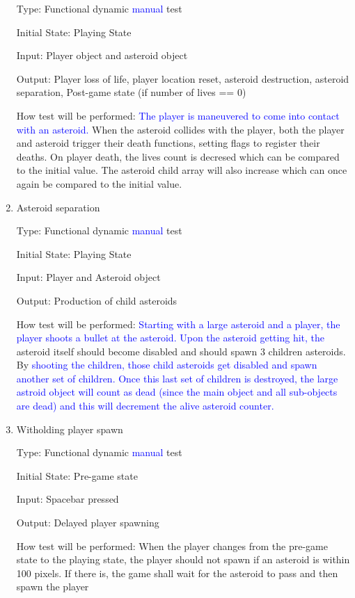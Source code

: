 \documentclass[12pt, titlepage]{article}
\begin{document}
\begin{enumerate}
Type: Functional dynamic \textcolor{blue}{manual} test

Initial State: Playing State

Input: Player object and asteroid object

Output: Player loss of life, player location reset, asteroid destruction, asteroid separation, Post-game state (if number of lives == 0)

How test will be performed: \textcolor{blue}{The player is maneuvered to come into contact with an asteroid.} When the asteroid collides with the player, both the player and asteroid trigger their death functions, setting flags to register their deaths. On player death, the lives count is decresed which can be compared to the initial value. The asteroid child array will also increase which can once again be compared to the initial value.

\item{Asteroid separation\\}

Type: Functional dynamic \textcolor{blue}{manual} test

Initial State: Playing State

Input: Player and Asteroid object

Output: Production of child asteroids

How test will be performed: \textcolor{blue}{Starting with a large asteroid and a player, the player shoots a bullet at the asteroid. Upon the asteroid getting hit, the} asteroid itself should become disabled and should spawn 3 children asteroids. By \textcolor{blue}{shooting the children, those child asteroids get disabled and spawn another set of children. Once this last set of children is destroyed, the large astroid object will count as dead (since the main object and all sub-objects are dead) and this will decrement the alive asteroid counter.}

\item{Witholding player spawn\\}

Type: Functional dynamic \textcolor{blue}{manual} test

Initial State: Pre-game state

Input: Spacebar pressed

Output: Delayed player spawning

How test will be performed: When the player changes from the pre-game state to the playing state, the player should not spawn if an asteroid is within 100 pixels. If there is, the game shall wait for the asteroid to pass and then spawn the player

\end{enumerate}
\end{document}
